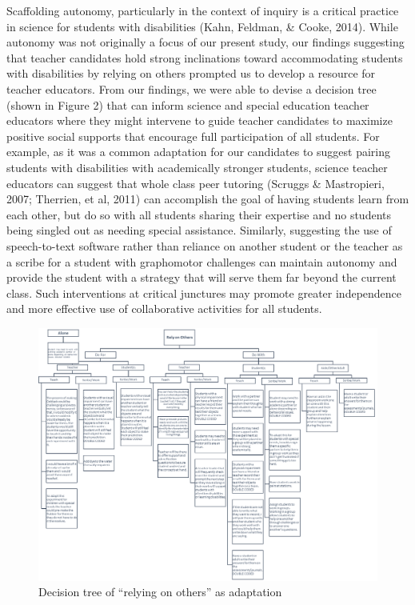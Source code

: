 \documentclass[11.5pt]{sig-alternate} %
\begin{document}
\begin{large}
Scaffolding autonomy, particularly in the context of inquiry is a critical practice in science for students with disabilities (Kahn, Feldman, \& Cooke, 2014). While autonomy was not originally a focus of our present study, our findings suggesting that teacher candidates hold strong inclinations toward accommodating students with disabilities by relying on others prompted us to develop a resource for teacher educators. From our findings, we were able to devise a decision tree (shown in Figure 2) that can inform science and special education teacher educators where they might intervene to guide teacher candidates to maximize positive social supports that encourage full participation of all students. For example, as it was a common adaptation for our candidates to suggest pairing students with disabilities with academically stronger students, science teacher educators can suggest that whole class peer tutoring (Scruggs \& Mastropieri, 2007; Therrien, et al, 2011) can accomplish the goal of having students learn from each other, but do so with all students sharing their expertise and no students being singled out as needing special assistance.  Similarly, suggesting the use of speech-to-text software rather than reliance on another student or the teacher as a scribe for a student with graphomotor challenges can maintain autonomy and provide the student with a strategy that will serve them far beyond the current class.  Such interventions at critical junctures may promote greater independence and more effective use of collaborative activities for all students. 
  
\begin{figure}[htb]
    \centering
    \includegraphics[width=1\textwidth]{Figure_2.png}
    \caption{Decision tree of “relying on others” as adaptation}
\end{figure}


\end{large}
\end{document}
